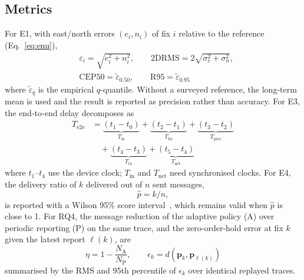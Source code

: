 \documentclass[conference]{IEEEtran}
\begin{document}
\subsection{Metrics}
For E1, with east/north errors $(e_i,n_i)$ of fix $i$ relative to the reference (Eq.~\ref{eq:enu}),
\begin{equation}
\begin{aligned}
&\varepsilon_i=\sqrt{e_i^2+n_i^2},\qquad \mathrm{2DRMS}=2\sqrt{\sigma_e^2+\sigma_n^2},\\
&\mathrm{CEP50}=\tilde{\varepsilon}_{0.50},\qquad \mathrm{R95}=\tilde{\varepsilon}_{0.95}
\end{aligned}
\label{eq:err}
\end{equation}
where $\tilde{\varepsilon}_q$ is the empirical $q$-quantile. Without a surveyed reference, the long-term mean is used and the result is reported as precision rather than accuracy. For E3, the end-to-end delay decomposes as
\begin{equation}
\begin{aligned}
T_{\mathrm{e2e}} &= \underbrace{(t_1-t_0)}_{T_{\mathrm{in}}}+\underbrace{(t_2-t_1)}_{T_{\mathrm{fix}}}+\underbrace{(t_3-t_2)}_{T_{\mathrm{proc}}}\\
&\quad+\underbrace{(t_4-t_3)}_{T_{\mathrm{tx}}}+\underbrace{(t_5-t_4)}_{T_{\mathrm{net}}}
\end{aligned}
\label{eq:lat}
\end{equation}
where $t_1$--$t_4$ use the device clock; $T_{\mathrm{in}}$ and $T_{\mathrm{net}}$ need synchronised clocks. For E4, the delivery ratio of $k$ delivered out of $n$ sent messages,
\begin{equation}
\hat{p}=k/n,
\label{eq:pdr}
\end{equation}
is reported with a Wilson 95\% score interval~\cite{wilson1927}, which remains valid when $\hat{p}$ is close to 1.
For RQ4, the message reduction of the adaptive policy (A) over periodic reporting (P) on the same trace, and the zero-order-hold error at fix $k$ given the latest report $\ell(k)$, are
\begin{equation}
\eta = 1-\frac{N_{\mathrm{A}}}{N_{\mathrm{P}}},\qquad \epsilon_k = d\!\left(\mathbf{p}_k,\mathbf{p}_{\ell(k)}\right)
\label{eq:eta}
\end{equation}
summarised by the RMS and 95th percentile of $\epsilon_k$ over identical replayed traces.
\end{document}

